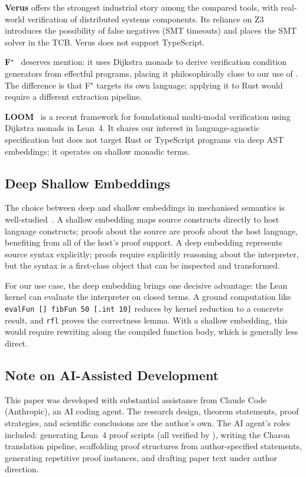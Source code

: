 \textbf{Verus} offers the strongest industrial story among the compared tools,
with real-world verification of distributed systems components. Its reliance on
Z3 introduces the possibility of false negatives (SMT timeouts) and places the
SMT solver in the TCB. Verus does not support TypeScript.

\textbf{F$^\star$}~\cite{fstar2016} deserves mention: it uses Dijkstra monads
to derive verification condition generators from effectful programs, placing
it philosophically close to our use of \RustM. The difference is that F$^\star$
targets its own language; applying it to Rust would require a different extraction
pipeline.

\textbf{LOOM}~\cite{loom2026} is a recent framework for foundational multi-modal
verification using Dijkstra monads in Lean~4. It shares our interest in
language-agnostic specification but does not target Rust or TypeScript programs
via deep AST embeddings; it operates on shallow monadic terms.

\subsection{Deep \vs Shallow Embeddings}

The choice between deep and shallow embeddings in mechanised semantics is
well-studied~\cite{coqArt}. A shallow embedding maps source constructs directly
to host language constructs; proofs about the source are proofs about the host
language, benefiting from all of the host's proof support. A deep embedding
represents source syntax explicitly; proofs require explicitly reasoning about
the interpreter, but the syntax is a first-class object that can be inspected
and transformed.

For our use case, the deep embedding brings one decisive advantage: the Lean
kernel can evaluate the interpreter on closed terms. A ground computation
like \texttt{evalFun [] fibFun 50 [.int 10]} reduces by kernel reduction
to a concrete result, and \texttt{rfl} proves the correctness lemma. With
a shallow embedding, this would require rewriting along the compiled function
body, which is generally less direct.

\subsection{Note on AI-Assisted Development}

This paper was developed with substantial assistance from Claude Code
(Anthropic), an AI coding agent. The research design, theorem statements,
proof strategies, and scientific conclusions are the author's own. The AI
agent's roles included: generating Lean~4 proof scripts (all verified by
), writing the Charon translation pipeline, scaffolding
proof structures from author-specified statements, generating repetitive proof
instances, and drafting paper text under author direction.

